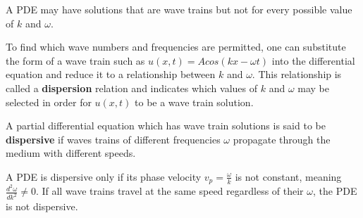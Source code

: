 \documentclass[12pt, letterpaper]{article}
\begin{document}
    A PDE may have solutions that are wave trains but not for every possible value of $k$ and
    $\omega$.

    To find which wave numbers and frequencies are permitted, one can substitute the form of a wave
    train such as $u(x, t) = Acos(kx - \omega t)$ into the differential equation and reduce it to a
    relationship between $k$ and $\omega$.
    This relationship is called a \textbf{dispersion} relation and indicates
    which values of $k$ and $\omega$ may be selected in order for $u(x, t)$ to be a wave train
    solution.

    A partial differential equation which has wave train solutions is said to be \textbf{dispersive}
    if waves trains of different frequencies $\omega$ propagate through the medium with different
    speeds.

    A PDE is dispersive only if its phase velocity $v_p = \frac{\omega}{k}$ is not constant,
    meaning $\frac{d^2\omega}{dk^2} \neq 0$.
    If all wave trains travel at the same speed regardless of their $\omega$, the PDE is not
    dispersive.
\end{document}
